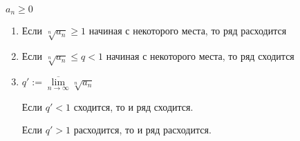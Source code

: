 \begin{theorem}\slashns
	
	$a_n \ge 0$
	
	\begin{enumerate}
		\item Если $\sqrt[n]{a_n} \ge 1$ начиная с некоторого места, то ряд расходится
		\item Если $\sqrt[n]{a_n} \le q < 1$ начиная с некоторого места, то ряд сходится
		\item $q' := \overline{\lim\limits_{n \to \infty}} \sqrt[n]{a_n}$
		
		Если $q' < 1$ сходится, то и ряд сходится.
		
		Если $q' > 1$ расходится, то и ряд расходится.
	\end{enumerate}
\end{theorem}

